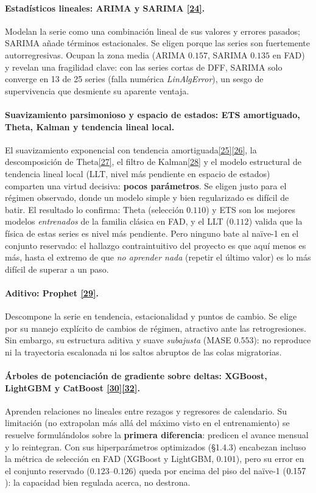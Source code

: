 \documentclass[12pt,letterpaper]{report}
\newcommand{\cita}[1]{\hyperref[bib:#1]{[#1]}}
\begin{document}
\paragraph{Estadísticos lineales: ARIMA y SARIMA \cita{24}.} Modelan la serie como una
combinación lineal de sus valores y errores pasados; SARIMA añade términos estacionales. Se
eligen porque las series son fuertemente autorregresivas. Ocupan la zona media (ARIMA $0.157$,
SARIMA $0.135$ en FAD) y revelan una fragilidad clave: con las series cortas de DFF, SARIMA solo
converge en 13 de 25 series (falla numérica \textit{LinAlgError}), un sesgo de supervivencia que
desmiente su aparente ventaja.

\paragraph{Suavizamiento parsimonioso y espacio de estados: ETS amortiguado, Theta, Kalman y
tendencia lineal local.} El suavizamiento exponencial con tendencia
amortiguada\cita{25}\cita{26}, la descomposición de Theta\cita{27}, el filtro de
Kalman\cita{28} y el modelo estructural de tendencia lineal local (LLT, nivel más pendiente
en espacio de estados) comparten una virtud decisiva: \textbf{pocos parámetros}. Se eligen
justo para el régimen observado, donde un modelo simple y bien regularizado es difícil de
batir. El resultado lo confirma: Theta (selección $0.110$) y ETS son los mejores modelos
\textit{entrenados} de la familia clásica en FAD, y el LLT ($0.112$) valida que la física de
estas series es nivel más pendiente. Pero ninguno bate al naïve-1 en el conjunto reservado:
el hallazgo contraintuitivo del proyecto es que aquí menos es más, hasta el extremo de que
\textit{no aprender nada} (repetir el último valor) es lo más difícil de superar a un paso.

\paragraph{Aditivo: Prophet \cita{29}.} Descompone la serie en tendencia, estacionalidad y puntos
de cambio. Se elige por su manejo explícito de cambios de régimen, atractivo ante las
retrogresiones. Sin embargo, su estructura aditiva y suave \textit{subajusta} (MASE $0.553$): no
reproduce ni la trayectoria escalonada ni los saltos abruptos de las colas migratorias.

\paragraph{Árboles de potenciación de gradiente sobre deltas: XGBoost, LightGBM y CatBoost
\cita{30}\textendash\cita{32}.} Aprenden relaciones no lineales entre rezagos y regresores de calendario. Su
limitación (no extrapolan más allá del máximo visto en el entrenamiento) se resuelve
formulándolos sobre la \textbf{primera diferencia}: predicen el avance mensual y lo reintegran.
Con sus hiperparámetros optimizados (§1.4.3) encabezan incluso la métrica de selección en FAD
(XGBoost y LightGBM, $0.101$), pero su error en el conjunto reservado ($0.123$--$0.126$)
queda por encima del piso del naïve-1 ($0.157$): la capacidad bien regulada acerca, no
destrona.
\end{document}

